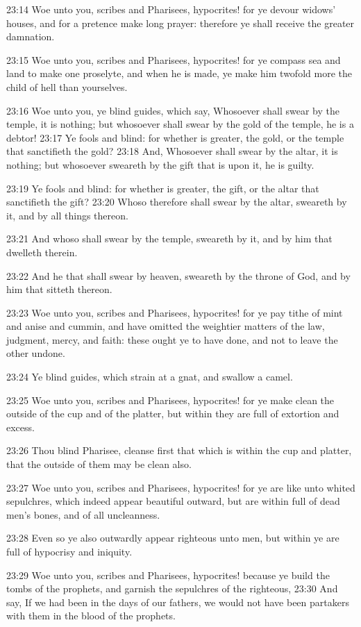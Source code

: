 23:14 Woe unto you, scribes and Pharisees, hypocrites! for ye devour widows' houses, and for a pretence make long prayer: therefore ye shall receive the greater damnation.

23:15 Woe unto you, scribes and Pharisees, hypocrites! for ye compass sea and land to make one proselyte, and when he is made, ye make him twofold more the child of hell than yourselves.

23:16 Woe unto you, ye blind guides, which say, Whosoever shall swear by the temple, it is nothing; but whosoever shall swear by the gold of the temple, he is a debtor!  23:17 Ye fools and blind: for whether is greater, the gold, or the temple that sanctifieth the gold?  23:18 And, Whosoever shall swear by the altar, it is nothing; but whosoever sweareth by the gift that is upon it, he is guilty.

23:19 Ye fools and blind: for whether is greater, the gift, or the altar that sanctifieth the gift?  23:20 Whoso therefore shall swear by the altar, sweareth by it, and by all things thereon.

23:21 And whoso shall swear by the temple, sweareth by it, and by him that dwelleth therein.

23:22 And he that shall swear by heaven, sweareth by the throne of God, and by him that sitteth thereon.

23:23 Woe unto you, scribes and Pharisees, hypocrites! for ye pay tithe of mint and anise and cummin, and have omitted the weightier matters of the law, judgment, mercy, and faith: these ought ye to have done, and not to leave the other undone.

23:24 Ye blind guides, which strain at a gnat, and swallow a camel.

23:25 Woe unto you, scribes and Pharisees, hypocrites! for ye make clean the outside of the cup and of the platter, but within they are full of extortion and excess.

23:26 Thou blind Pharisee, cleanse first that which is within the cup and platter, that the outside of them may be clean also.

23:27 Woe unto you, scribes and Pharisees, hypocrites! for ye are like unto whited sepulchres, which indeed appear beautiful outward, but are within full of dead men's bones, and of all uncleanness.

23:28 Even so ye also outwardly appear righteous unto men, but within ye are full of hypocrisy and iniquity.

23:29 Woe unto you, scribes and Pharisees, hypocrites! because ye build the tombs of the prophets, and garnish the sepulchres of the righteous, 23:30 And say, If we had been in the days of our fathers, we would not have been partakers with them in the blood of the prophets.

